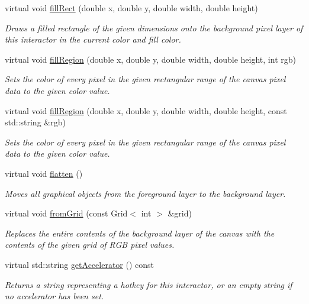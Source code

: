 \begin{DoxyCompactItemize}
virtual void \mbox{\hyperlink{classGDrawingSurface_aac3ae7d3aee950de78eca0e108352254}{fill\+Rect}} (double x, double y, double width, double height)
\begin{DoxyCompactList}\small\item\em Draws a filled rectangle of the given dimensions onto the background pixel layer of this interactor in the current color and fill color. \end{DoxyCompactList}\item 
virtual void \mbox{\hyperlink{classGCanvas_af4146bdcb26135b739b9b4f13db03435}{fill\+Region}} (double x, double y, double width, double height, int rgb)
\begin{DoxyCompactList}\small\item\em Sets the color of every pixel in the given rectangular range of the canvas pixel data to the given color value. \end{DoxyCompactList}\item 
virtual void \mbox{\hyperlink{classGCanvas_a762c611a5065687112018e7a0ab10c84}{fill\+Region}} (double x, double y, double width, double height, const std\+::string \&rgb)
\begin{DoxyCompactList}\small\item\em Sets the color of every pixel in the given rectangular range of the canvas pixel data to the given color value. \end{DoxyCompactList}\item 
virtual void \mbox{\hyperlink{classGCanvas_a4c4590df33ce47ad8a42e06f9f44fc93}{flatten}} ()
\begin{DoxyCompactList}\small\item\em Moves all graphical objects from the foreground layer to the background layer. \end{DoxyCompactList}\item 
virtual void \mbox{\hyperlink{classGCanvas_a46b18491b5230c765fbd9b8c7a095587}{from\+Grid}} (const Grid$<$ int $>$ \&grid)
\begin{DoxyCompactList}\small\item\em Replaces the entire contents of the background layer of the canvas with the contents of the given grid of R\+GB pixel values. \end{DoxyCompactList}\item 
virtual std\+::string \mbox{\hyperlink{classGInteractor_a69f8d23ed8f207fbecad99960776e942}{get\+Accelerator}} () const
\begin{DoxyCompactList}\small\item\em Returns a string representing a hotkey for this interactor, or an empty string if no accelerator has been set. \end{DoxyCompactList}\item 

\end{DoxyCompactItemize}
